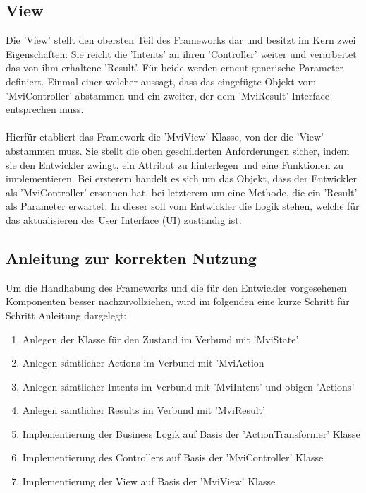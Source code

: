 \subsection{View}
Die 'View' stellt den obersten Teil des Frameworks dar und besitzt im Kern zwei Eigenschaften: Sie reicht die 'Intents' an ihren 'Controller' weiter und verarbeitet das von ihm erhaltene 'Result'. Für beide werden erneut generische Parameter definiert. Einmal einer welcher aussagt, dass das eingefügte Objekt vom 'MviController' abstammen und ein zweiter, der dem 'MviResult' Interface entsprechen muss.
\\\\
Hierfür etabliert das Framework die 'MviView' Klasse, von der die 'View' abstammen muss. Sie stellt die oben geschilderten Anforderungen sicher, indem sie den Entwickler zwingt, ein Attribut zu hinterlegen und eine Funktionen zu implementieren. Bei ersterem handelt es sich um das Objekt, dass der Entwickler als 'MviController' ersonnen hat, bei letzterem um eine Methode, die ein 'Result' als Parameter erwartet. In dieser soll vom Entwickler die Logik stehen, welche für das aktualisieren des User Interface (UI) zuständig ist. 

\subsection{Anleitung zur korrekten Nutzung}
Um die Handhabung des Frameworks und die für den Entwickler vorgesehenen Komponenten besser nachzuvollziehen, wird im folgenden eine kurze Schritt für Schritt Anleitung dargelegt:
\begin{enumerate}
	\item Anlegen der Klasse für den Zustand im Verbund mit 'MviState'
	\item Anlegen sämtlicher Actions im Verbund mit 'MviAction
	\item Anlegen sämtlicher Intents im Verbund mit 'MviIntent' und obigen 'Actions'
	\item Anlegen sämtlicher Results im Verbund mit 'MviResult'
	\item Implementierung der Business Logik auf Basis der 'ActionTransformer' Klasse
	\item Implementierung des Controllers auf Basis der 'MviController' Klasse
	\item Implementierung der View auf Basis der 'MviView' Klasse
\end{enumerate}
